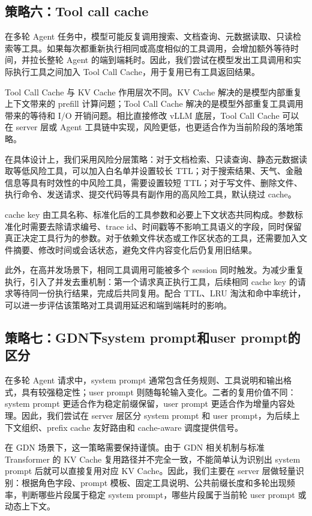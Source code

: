 \subsection{策略六：Tool call cache}
在多轮 Agent 任务中，模型可能反复调用搜索、文档查询、元数据读取、只读检索等工具。如果每次都重新执行相同或高度相似的工具调用，会增加额外等待时间，并拉长整轮 Agent 的端到端耗时。因此，我们尝试在模型发出工具调用和实际执行工具之间加入 Tool Call Cache，用于复用已有工具返回结果。

Tool Call Cache 与 KV Cache 作用层次不同。KV Cache 解决的是模型内部重复上下文带来的 prefill 计算问题；Tool Call Cache 解决的是模型外部重复工具调用带来的等待和 I/O 开销问题。相比直接修改 vLLM 底层，Tool Call Cache 可以在 server 层或 Agent 工具链中实现，风险更低，也更适合作为当前阶段的落地策略。

在具体设计上，我们采用风险分层策略：对于文档检索、只读查询、静态元数据读取等低风险工具，可以加入白名单并设置较长 TTL；对于搜索结果、天气、金融信息等具有时效性的中风险工具，需要设置较短 TTL；对于写文件、删除文件、执行命令、发送请求、提交代码等具有副作用的高风险工具，默认绕过 cache。

cache key 由工具名称、标准化后的工具参数和必要上下文状态共同构成。参数标准化时需要去除请求编号、trace id、时间戳等不影响工具语义的字段，同时保留真正决定工具行为的参数。对于依赖文件状态或工作区状态的工具，还需要加入文件摘要、修改时间或会话状态，避免文件内容变化后仍复用旧结果。

此外，在高并发场景下，相同工具调用可能被多个 session 同时触发。为减少重复执行，引入了并发去重机制：第一个请求真正执行工具，后续相同 cache key 的请求等待同一份执行结果，完成后共同复用。配合 TTL、LRU 淘汰和命中率统计，可以进一步评估该策略对工具调用延迟和端到端耗时的影响。

\subsection{策略七：GDN下system prompt和user prompt的区分}
在多轮 Agent 请求中，system prompt 通常包含任务规则、工具说明和输出格式，具有较强稳定性；user prompt 则随每轮输入变化。二者的复用价值不同：system prompt 更适合作为稳定前缀保留，user prompt 更适合作为增量内容处理。因此，我们尝试在 server 层区分 system prompt 和 user prompt，为后续上下文组织、prefix cache 友好路由和 cache-aware 调度提供信号。

在 GDN 场景下，这一策略需要保持谨慎。由于 GDN 相关机制与标准 Transformer 的 KV Cache 复用路径并不完全一致，不能简单认为识别出 system prompt 后就可以直接复用对应 KV Cache。因此，我们主要在 server 层做轻量识别：根据角色字段、prompt 模板、固定工具说明、公共前缀长度和多轮出现频率，判断哪些片段属于稳定 system prompt，哪些片段属于当前轮 user prompt 或动态上下文。

